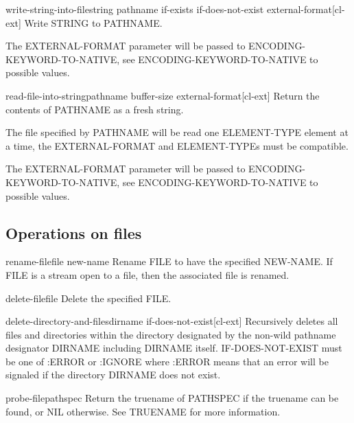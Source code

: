 \documentclass[10pt,english]{book}
\begin{document}
\begin{function}{write-string-into-file}{string pathname \key if-exists if-does-not-exist external-format}[cl-ext]
  Write STRING to PATHNAME.

The EXTERNAL-FORMAT parameter will be passed to
ENCODING-KEYWORD-TO-NATIVE, see ENCODING-KEYWORD-TO-NATIVE to
possible values.
\end{function}

\begin{function}{read-file-into-string}{pathname \key buffer-size external-format}[cl-ext]
  Return the contents of PATHNAME as a fresh string.

The file specified by PATHNAME will be read one ELEMENT-TYPE
element at a time, the EXTERNAL-FORMAT and ELEMENT-TYPEs must be
compatible.

The EXTERNAL-FORMAT parameter will be passed to
ENCODING-KEYWORD-TO-NATIVE, see ENCODING-KEYWORD-TO-NATIVE to
possible values.
\end{function}

\subsection{Operations on files}
\label{sec:operations-files}

\begin{function}{rename-file}{file new-name}
  Rename FILE to have the specified NEW-NAME. If FILE is a stream open to a
  file, then the associated file is renamed.
\end{function}

\begin{function}{delete-file}{file}
  Delete the specified FILE.
\end{function}

\begin{function}{delete-directory-and-files}{dirname \key if-does-not-exist}[cl-ext]
  Recursively deletes all files and directories within the directory
  designated by the non-wild pathname designator DIRNAME including
  DIRNAME itself. IF-DOES-NOT-EXIST must be one of :ERROR or :IGNORE
  where :ERROR means that an error will be signaled if the directory
  DIRNAME does not exist.
\end{function}

\begin{function}{probe-file}{pathspec}
  Return the truename of PATHSPEC if the truename can be found,
or NIL otherwise.  See TRUENAME for more information.
\end{function}
\end{document}
